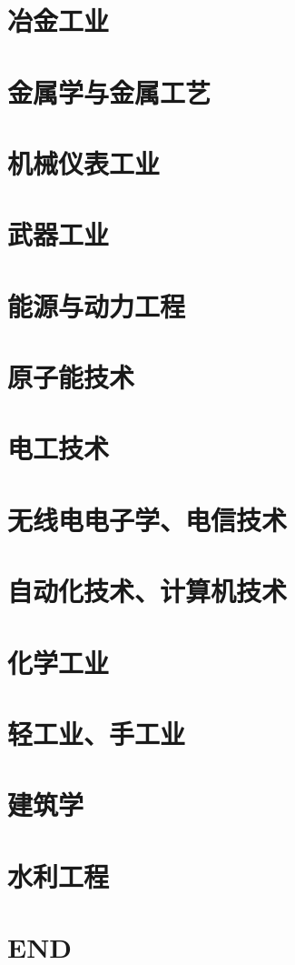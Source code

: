 \documentclass[UTF8]{../ApplicationUniverse}
\begin{document}
\chapter{冶金工业}%
\chapter{金属学与金属工艺}%
\chapter{机械仪表工业}%
\chapter{武器工业}%
\chapter{能源与动力工程}%
\chapter{原子能技术}%
\chapter{电工技术}%
\chapter{无线电电子学、电信技术}%
\chapter{自动化技术、计算机技术}%
\chapter{化学工业}%
\chapter{轻工业、手工业}%
\chapter{建筑学}%
\chapter{水利工程}%











\chapter{END}
\end{document}
